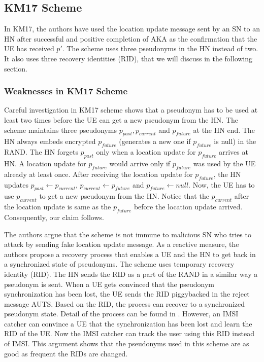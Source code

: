 \documentclass{llncs} %
\begin{document}
\subsection{KM17 Scheme}
In KM17, the authors have used the location update message sent by an SN to an HN after successful and positive completion of AKA as the confirmation that the UE has received $p'$. The scheme uses three pseudonyms in the HN instead of two. It also uses three recovery identities (RID), that we will discuss in the following section.


\subsubsection{Weaknesses in KM17 Scheme}
Careful investigation in KM17 scheme shows that a pseudonym has to be used at least two times before the UE can get a new pseudonym from the HN. The scheme maintains three pseudonyms $p_{past},p_{current}$ and $p_{future}$ at the HN end. The HN always embeds encrypted $p_{future}$ (generates a new one if $p_{future}$ is null) in the RAND. The HN forgets $p_{past}$ only when a location update for $p_{future}$ arrives at HN. A location update for $p_{future}$ would arrive only if $p_{future}$ was used by the UE already at least once. After receiving the location update for $p_{future}$, the HN updates $p_{past} \leftarrow p_{current}$, $p_{current} \leftarrow p_{future}$ and $p_{future} \leftarrow null$. Now, the UE has to use $p_{current}$ to get a new pseudonym from the HN. Notice that the $p_{current}$ after the location update is same as the $p_{future}$ before the location update arrived. Consequently, our claim follows.

The authors argue that the scheme is not immune to malicious SN who tries to attack by sending fake location update message. As a reactive measure, the authors propose a recovery process that enables a UE and the HN to get back in a synchronized state of pseudonyms. The scheme uses temporary recovery identity (RID). The HN sends the RID as a part of the RAND in a similar way a pseudonym is sent. When a UE gets convinced that the pseudonym synchronization has been lost, the UE sends the RID piggybacked in the reject message AUTS. Based on the RID, the process can recover to a synchronized pseudonym state. Detail of the process can be found in \cite{wisec17}. However, an IMSI catcher can convince a UE that the synchronization has been lost and learn the RID of the UE. Now the IMSI catcher can track the user using this RID instead of IMSI. This argument shows that the pseudonyms used in this scheme are as good as frequent the RIDs are changed. 
\end{document}

